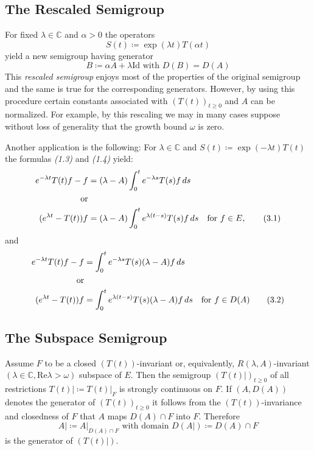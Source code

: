 \subsection{The Rescaled Semigroup}\label{subsec:a1-3.1}
For fixed $\lambda \in \mathbb{C}$ and $\alpha > 0$ the operators
\[
    S(t) \coloneqq \exp(\lambda t)T(\alpha t)
\]
yield a new semigroup having generator
\[
    B \coloneqq \alpha A + \lambda \text{Id} \text{ with } D(B) = D(A)
\]
This \emph{rescaled semigroup} enjoys most of the properties of the original semigroup and the same is true for the corresponding generators.
However, by using this procedure certain constants associated with $(T(t))_{t \geq 0}$ and $A$ can be normalized.
For example, by this rescaling we may in many cases suppose without loss of generality that the growth bound $\omega$ is zero.

Another application is the following: For $\lambda \in \mathbb{C}$ and $S(t) \coloneqq \exp(-\lambda t)T(t)$ the formulas \emph{(1.3)} and \emph{(1.4)} yield:
\begin{align}
    e^{-\lambda t}T(t)f - f &= (\lambda-A) \int_{0}^{t} e^{-\lambda s}T(s)f \,ds \notag \\
    \text{or} \notag \\
    (e^{\lambda t}-T(t))f &= (\lambda-A) \int_{0}^{t} e^{\lambda(t-s)}T(s)f \,ds \quad \text{for } f \in E, \tag{3.1}
\end{align}
and
\begin{align}
    e^{-\lambda t}T(t)f - f &= \int_{0}^{t} e^{-\lambda s}T(s)(\lambda-A)f \,ds \notag \\
    \text{or} \notag \\
    (e^{\lambda t} - T(t))f &= \int_{0}^{t} e^{\lambda(t-s)}T(s)(\lambda-A)f \,ds \quad \text{for } f \in D(A) \tag{3.2}
\end{align}
\subsection{The Subspace Semigroup}\label{subsec:a1-3.2}
Assume $F$ to be a closed $(T(t))$-invariant or, equivalently, $R(\lambda,A)$-invariant $(\lambda \in \mathbb{C}, \text{Re}\lambda > \omega)$ subspace of $E$.
Then the semigroup $(T(t)|)_{t \geq 0}$ of all restrictions $T(t)| \coloneqq T(t)|_{F}$ is strongly continuous on $F$.
If $(A,D(A))$ denotes the generator of $(T(t))_{t \geq 0}$ it follows from the $(T(t))$-invariance and closedness of $F$ that $A$ maps $D(A) \cap F$ into $F$.
Therefore
\[
    A| \coloneqq A|_{D(A)\cap F} \text{ with domain } D(A|) \coloneqq D(A) \cap F
\]
is the generator of $(T(t)|)$.

